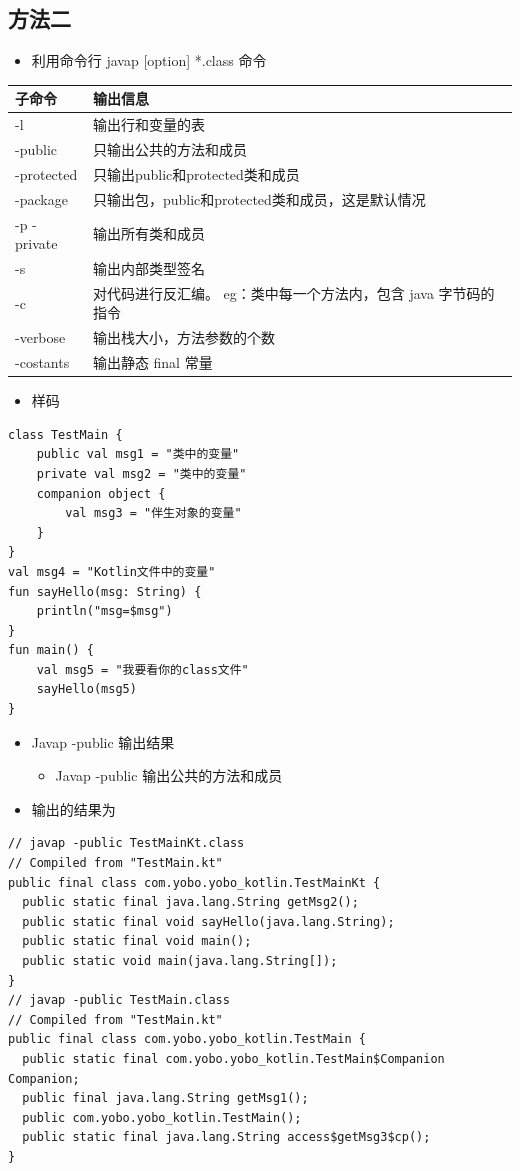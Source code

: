 \documentclass[9pt, b5paper]{article}
\begin{document}
\subsection{方法二}
\label{sec-5-2}
\begin{itemize}
\item 利用命令行 javap [option] *.class 命令
\end{itemize}
\begin{center}
\begin{tabular}{ll}
\hline
子命令 & 输出信息\\
\hline
-l & 输出行和变量的表\\
-public & 只输出公共的方法和成员\\
-protected & 只输出public和protected类和成员\\
-package & 只输出包，public和protected类和成员，这是默认情况\\
-p -private & 输出所有类和成员\\
-s & 输出内部类型签名\\
-c & 对代码进行反汇编。 eg：类中每一个方法内，包含 java 字节码的指令\\
-verbose & 输出栈大小，方法参数的个数\\
-costants & 输出静态 final 常量\\
\hline
\end{tabular}
\end{center}
\begin{itemize}
\item 样码
\end{itemize}
\begin{verbatim}
class TestMain {
    public val msg1 = "类中的变量"
    private val msg2 = "类中的变量"
    companion object {
        val msg3 = "伴生对象的变量"
    }
}
val msg4 = "Kotlin文件中的变量"
fun sayHello(msg: String) {
    println("msg=$msg")
}
fun main() {
    val msg5 = "我要看你的class文件"
    sayHello(msg5)
}
\end{verbatim}
\begin{itemize}
\item Javap -public 输出结果
\begin{itemize}
\item Javap -public     输出公共的方法和成员
\end{itemize}
\item 输出的结果为
\end{itemize}
\begin{verbatim}
// javap -public TestMainKt.class
// Compiled from "TestMain.kt"
public final class com.yobo.yobo_kotlin.TestMainKt {
  public static final java.lang.String getMsg2();
  public static final void sayHello(java.lang.String);
  public static final void main();
  public static void main(java.lang.String[]);
}
// javap -public TestMain.class
// Compiled from "TestMain.kt"
public final class com.yobo.yobo_kotlin.TestMain {
  public static final com.yobo.yobo_kotlin.TestMain$Companion Companion;
  public final java.lang.String getMsg1();
  public com.yobo.yobo_kotlin.TestMain();
  public static final java.lang.String access$getMsg3$cp();
}
\end{verbatim}
\end{document}
